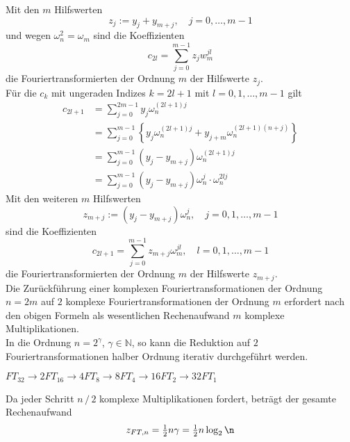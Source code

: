 Mit den $m$ Hilfswerten 
\[
    z_j := y_j + y_{m+j}, \quad j=0,\dots,m-1
\]
und wegen $\omega_n^2 = \omega_m$ sind die Koeffizienten 
\[
    c_{2l} = \sum_{j=0}^{m-1} z_jw_m^{jl}
\]
die Fouriertransformierten der Ordnung $m$ der Hilfswerte $z_j$. \\
Für die $c_k$ mit ungeraden Indizes $k=2l+1$ mit $l=0,1,\dots,m-1$ gilt 
\begin{align*}
    c_{2l+1} &= \sum_{j=0}^{2m-1} y_j\omega_n^{(2l+1)j} \\
    &= \sum_{j=0}^{m-1}\left\{ y_j\omega_n^{(2l+1)j}+y_{j+m}\omega_n^{(2l+1)(n+j)}\right\}\\
    &= \sum_{j=0}^{m-1}(y_j-y_{m+j})\omega_n^{(2l+1)j} \\
    &= \sum_{j=0}^{m-1}(y_j-y_{m+j})\omega_n^{j}\cdot\omega_n^{2lj}
\end{align*}
Mit den weiteren $m$ Hilfswerten
\[
    z_{m+j} := (y_j-y_{m+j})\omega_n^j,\quad j=0,1,\dots,m-1
\]
sind die Koeffizienten
\[
    c_{2l+1} = \sum_{j=0}^{m-1} z_{m+j} \omega_m^{jl}, \quad l=0,1,\dots,m-1
\]
die Fouriertransformierten der Ordnung $m$ der Hilfswerte $z_{m+j}$. \\
Die Zurückführung einer komplexen Fouriertransformationen der Ordnung $n=2m$ auf $2$ komplexe Fouriertransformationen 
der Ordnung $m$ erfordert nach den obigen Formeln als wesentlichen Rechenaufwand $m$ komplexe Multiplikationen. \\
In die Ordnung $n=2^\gamma$, $\gamma\in\mathbb{N}$, so kann die Reduktion auf $2$ Fouriertransformationen halber Ordnung
iterativ durchgeführt werden. \\
\begin{egbox}
    $FT_{32} \to 2FT_{16}\to 4FT_8 \to 8FT_4 \to 16FT_2\to 32FT_1$
\end{egbox}
Da jeder Schritt $n\,/\,2$ komplexe Multiplikationen fordert, beträgt der gesamte Rechenaufwand
\[
    z_{FT,n} = \tfrac{1}{2}n\gamma = \tfrac{1}{2}n\log_2\n
\]

